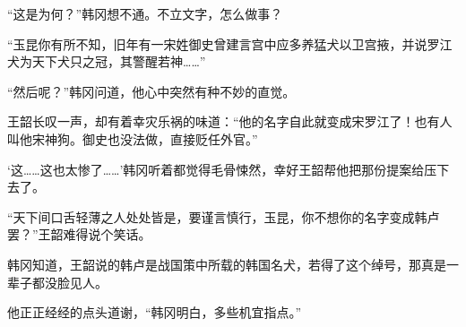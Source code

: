“这是为何？”韩冈想不通。不立文字，怎么做事？

“玉昆你有所不知，旧年有一宋姓御史曾建言宫中应多养猛犬以卫宫掖，并说罗江犬为天下犬只之冠，其警醒若神……”

“然后呢？”韩冈问道，他心中突然有种不妙的直觉。

王韶长叹一声，却有着幸灾乐祸的味道：“他的名字自此就变成宋罗江了！也有人叫他宋神狗。御史也没法做，直接贬任外官。”

‘这……这也太惨了……’韩冈听着都觉得毛骨悚然，幸好王韶帮他把那份提案给压下去了。

“天下间口舌轻薄之人处处皆是，要谨言慎行，玉昆，你不想你的名字变成韩卢罢？”王韶难得说个笑话。

韩冈知道，王韶说的韩卢是战国策中所载的韩国名犬，若得了这个绰号，那真是一辈子都没脸见人。

他正正经经的点头道谢，“韩冈明白，多些机宜指点。”

